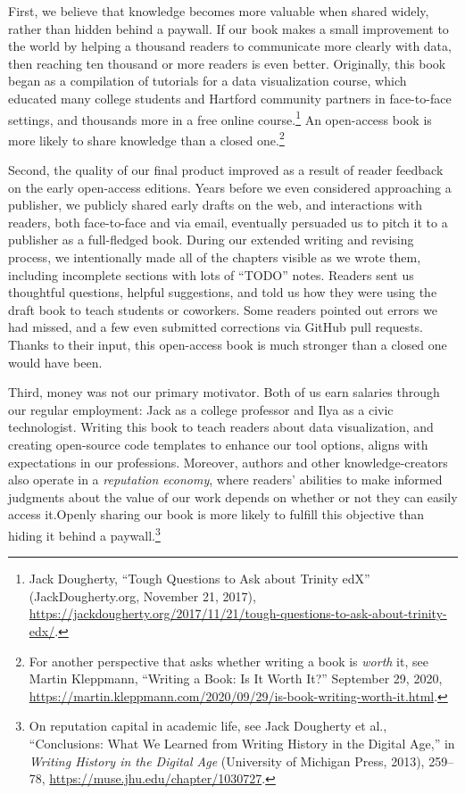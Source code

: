 \documentclass[
  english,
]{book}
\begin{document}
First, we believe that knowledge becomes more valuable when shared widely, rather than hidden behind a paywall. If our book makes a small improvement to the world by helping a thousand readers to communicate more clearly with data, then reaching ten thousand or more readers is even better. Originally, this book began as a compilation of tutorials for a data visualization course, which educated many college students and Hartford community partners in face-to-face settings, and thousands more in a free online course.\footnote{Jack Dougherty, {``Tough {Questions} to {Ask} about {Trinity edX}''} ({JackDougherty.org}, November 21, 2017), \url{https://jackdougherty.org/2017/11/21/tough-questions-to-ask-about-trinity-edx/}.} An open-access book is more likely to share knowledge than a closed one.\footnote{For another perspective that asks whether writing a book is \emph{worth} it, see Martin Kleppmann, {``Writing a {Book}: {Is It Worth It}?''} September 29, 2020, \url{https://martin.kleppmann.com/2020/09/29/is-book-writing-worth-it.html}.}

Second, the quality of our final product improved as a result of reader feedback on the early open-access editions. Years before we even considered approaching a publisher, we publicly shared early drafts on the web, and interactions with readers, both face-to-face and via email, eventually persuaded us to pitch it to a publisher as a full-fledged book. During our extended writing and revising process, we intentionally made all of the chapters visible as we wrote them, including incomplete sections with lots of ``TODO'' notes. Readers sent us thoughtful questions, helpful suggestions, and told us how they were using the draft book to teach students or coworkers. Some readers pointed out errors we had missed, and a few even submitted corrections via GitHub pull requests. Thanks to their input, this open-access book is much stronger than a closed one would have been.

Third, money was not our primary motivator. Both of us earn salaries through our regular employment: Jack as a college professor and Ilya as a civic technologist. Writing this book to teach readers about data visualization, and creating open-source code templates to enhance our tool options, aligns with expectations in our professions. Moreover, authors and other knowledge-creators also operate in a \emph{reputation economy}, where readers' abilities to make informed judgments about the value of our work depends on whether or not they can easily access it.Openly sharing our book is more likely to fulfill this objective than hiding it behind a paywall.\footnote{On reputation capital in academic life, see Jack Dougherty et al., {``Conclusions: {What We Learned} from {Writing History} in the {Digital Age},''} in \emph{Writing {History} in the {Digital Age}} ({University of Michigan Press}, 2013), 259--78, \url{https://muse.jhu.edu/chapter/1030727}.}
\end{document}
